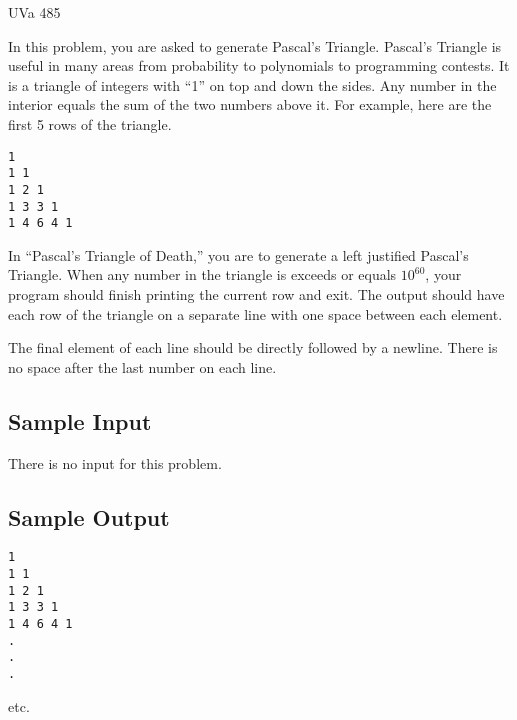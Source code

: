 

\noindent
UVa 485\bigskip

In this problem, you are asked to generate Pascal's Triangle. Pascal's Triangle is useful in many
areas from probability to polynomials to programming contests. It is a triangle of integers with
``1'' on top and down the sides. Any number in the interior equals the sum of the two numbers
above it. For example, here are the first 5 rows of the triangle.

\begin{verbatim}
1  
1 1  
1 2 1  
1 3 3 1  
1 4 6 4 1
\end{verbatim}

In ``Pascal's Triangle of Death,'' you are to generate a left justified Pascal's Triangle. When any
number in the triangle is exceeds or equals $10^{60}$, your program should finish printing the
current row and exit. The output should have each row of the triangle on a separate line with one
space between each element.

The final element of each line should be directly followed by a
newline. There is no space after the last number on each line.

\subsection*{Sample Input}

There is no input for this problem.

\subsection*{Sample Output}

\begin{verbatim}
1
1 1
1 2 1
1 3 3 1
1 4 6 4 1
.
.
.
\end{verbatim}

etc.
